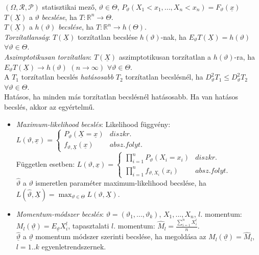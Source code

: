 \documentclass[tikz,12pt,margin=0px]{article}
\newcommand\ddfrac[2]{\frac{\displaystyle #1}{\displaystyle #2}}
\begin{document}
	$(\Omega, \mathcal{R}, \mathcal{P})$ statisztikai mező, $\vartheta \in \Theta$, $P_{\vartheta}(X_1<x_1,...,X_n<x_n) = F_{\vartheta}(\underline{x})$ \\
	$T(\underline{X})$ a $\vartheta$ \textit{becslése}, ha $T: \mathbb{R}^n \to \Theta$. \\
	$T(\underline{X})$ a $h(\vartheta)$ \textit{becslése}, ha $T: \mathbb{R}^n \to h(\Theta)$. \\
	\textit{Torzítatlanság}: $T(\underline{X})$ torzítatlan becslése $h(\vartheta)$-nak, ha $E_{\vartheta}T(\underline{X}) = h(\vartheta)$ $\forall \vartheta \in \Theta$. \\
	\textit{Aszimptotikusan torzítatlan}: $T(\underline{X})$ aszimptotikusan torzítatlan a $h(\vartheta)$-ra, ha $E_{\vartheta}T(\underline{X}) \to h(\vartheta)$ $(n \to \infty)$ $\forall \vartheta \in \Theta$. \\
	A $T_1$ torzítatlan becslés \textit{hatásosabb} $T_2$ torzítatlan becslésnél, ha $D_{\vartheta}^{2}T_1 \leq D_{\vartheta}^{2}T_2$ $\forall \vartheta \in \Theta$. \\
	Hatásos, ha minden más torzítatlan becslésnél hatásosabb. Ha van hatásos becslés, akkor az egyértelmű.
	
	\begin{itemize}
		\item \textit{Maximum-likelihood becslés}: Likelihood függvény: $L(\vartheta, \underline{x}) = \left\{\begin{array} {lr}
		P_{\vartheta}(\underline{X} = \underline{x}) & diszkr. \\
		f_{\vartheta, \underline{X}}(\underline{x}) & absz. folyt.
		\end{array}\right.$ \\
		Független esetben: $L(\vartheta, \underline{x}) = \left\{\begin{array} {lr}
		\prod_{i=1}^{n}{P_{\vartheta}(X_i = x_i)} & diszkr. \\
		\prod_{i=1}^{n}{f_{\vartheta, X_i}(x_i)} & absz. folyt.
		\end{array}\right.$\\
		$\hat{\vartheta}$ a $\vartheta$ ismeretlen paraméter maximum-likelihood becslése, ha $L(\hat{\vartheta},\underline{X}) = \max_{\vartheta \in \Theta}{L(\vartheta,\underline{X})}$.
		\item \textit{Momentum-módszer becslés}: $\vartheta = (\vartheta_1, ..., \vartheta_k)$, $X_1, ..., X_n$, $l.$ momentum: $M_l(\underline{\vartheta}) = E_{\underline{\vartheta}}X_{i}^{l}$, tapasztalati $l.$ momentum: $\hat{M}_l = \ddfrac{\sum_{i=1}^{n}{X_i^l}}{n}$. \\ $\hat{\underline{\vartheta}}$ a $\underline{\vartheta}$ momentum módszer szerinti becslése, ha megoldása az $M_l(\underline{\vartheta}) = \hat{M}_l$, $l=1..k$ egyenletrendszernek.
	\end{itemize}
	
\end{document}
